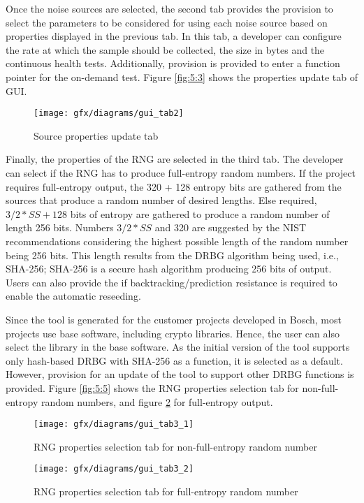 Once the noise sources are selected, the second tab provides the provision to select the parameters to be considered for using each noise source based on properties displayed in the previous tab. In this tab, a developer can configure the rate at which the sample should be collected, the size in bytes and the continuous health tests. Additionally, provision is provided to enter a function pointer for the on-demand test. Figure \ref{fig:5:3} shows the properties update tab of GUI.

\begin{figure}[!h]
	\centering
	\texttt{[image: gfx/diagrams/gui\_tab2]}
	\caption{Source properties update tab}
	\label{fig:5:4}
\end{figure}

Finally, the properties of the RNG are selected in the third tab. The developer can select if the RNG has to produce full-entropy random numbers. If the project requires full-entropy output, the 320 + 128 entropy bits are gathered from the sources that produce a random number of desired lengths. Else required, $3/2 * SS + 128$ bits of entropy are gathered to produce a random number of length 256 bits. Numbers $3/2*SS$ and 320 are suggested by the NIST recommendations \cite{SP90C-2022} considering the highest possible length of the random number being 256 bits. This length results from the DRBG algorithm being used, i.e., SHA-256; SHA-256 is a secure hash algorithm producing 256 bits of output. Users can also provide the if backtracking/prediction resistance is required to enable the automatic reseeding.

Since the tool is generated for the customer projects developed in Bosch, most projects use base software, including crypto libraries. Hence, the user can also select the library in the base software. As the initial version of the tool supports only hash-based DRBG with SHA-256 as a function, it is selected as a default. However, provision for an update of the tool to support other DRBG functions is provided. Figure \ref{fig:5:5} shows the RNG properties selection tab for non-full-entropy random numbers, and figure \ref{fig:5:6} for full-entropy output.

\begin{figure}[!h]
	\centering
	\begin{minipage}[b]{5 cm}
		\texttt{[image: gfx/diagrams/gui\_tab3\_1]} 
		\caption{RNG properties selection tab for non-full-entropy random number}
		\label{fig:5:5}
	\end{minipage}
	\begin{minipage}[b]{5 cm}
		\texttt{[image: gfx/diagrams/gui\_tab3\_2]}  
		\caption{RNG properties selection tab for full-entropy random number}
		\label{fig:5:6}
	\end{minipage}
\end{figure}

